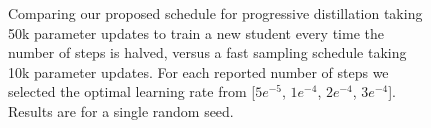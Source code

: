 \documentclass[hidelinks]{article} %
\begin{document}
\begin{figure}[htb]
\begin{minipage}[b]{.333\textwidth}
\end{minipage}
\caption{Comparing our proposed schedule for progressive distillation taking 50k parameter updates to train a new student every time the number of steps is halved, versus a fast sampling schedule taking 10k parameter updates. For each reported number of steps we selected the optimal learning rate from [$5e^{-5}$, $1e^{-4}$, $2e^{-4}$, $3e^{-4}$]. Results are for a single random seed.}
\label{fig:other_fast}
\end{figure}
\end{document}
